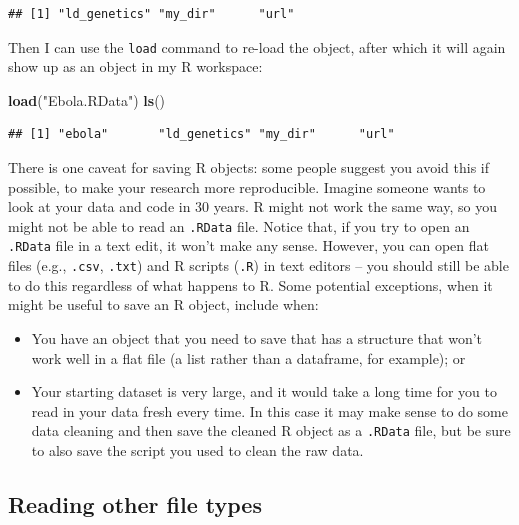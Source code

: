 \documentclass[]{book}
\makeatletter
\newenvironment{Shaded}{\begin{snugshade}}{\end{snugshade}}
\newcommand{\KeywordTok}[1]{\textcolor[rgb]{0.13,0.29,0.53}{\textbf{{#1}}}}
\newcommand{\StringTok}[1]{\textcolor[rgb]{0.31,0.60,0.02}{{#1}}}
\newcommand{\NormalTok}[1]{{#1}}
\providecommand{\tightlist}{%
  \setlength{\itemsep}{0pt}\setlength{\parskip}{0pt}}
\newenvironment{kframe}{%
\medskip{}
\setlength{\fboxsep}{.8em}
 \def\at@end@of@kframe{}%
 \ifinner\ifhmode%
  \def\at@end@of@kframe{\end{minipage}}%
  \begin{minipage}{\columnwidth}%
 \fi\fi%
 \def\FrameCommand##1{\hskip\@totalleftmargin \hskip-\fboxsep
 \colorbox{shadecolor}{##1}\hskip-\fboxsep
     \hskip-\linewidth \hskip-\@totalleftmargin \hskip\columnwidth}%
 \MakeFramed {\advance\hsize-\width
   \@totalleftmargin\z@ \linewidth\hsize
   \@setminipage}}%
 {\par\unskip\endMakeFramed%
 \at@end@of@kframe}
\renewenvironment{Shaded}{\begin{kframe}}{\end{kframe}}
\makeatother
\begin{document}
\begin{verbatim}
## [1] "ld_genetics" "my_dir"      "url"
\end{verbatim}

Then I can use the \texttt{load} command to re-load the object, after
which it will again show up as an object in my R workspace:

\begin{Shaded}
\begin{Highlighting}[]
\KeywordTok{load}\NormalTok{(}\StringTok{"Ebola.RData"}\NormalTok{)}
\KeywordTok{ls}\NormalTok{()}
\end{Highlighting}
\end{Shaded}

\begin{verbatim}
## [1] "ebola"       "ld_genetics" "my_dir"      "url"
\end{verbatim}

There is one caveat for saving R objects: some people suggest you avoid
this if possible, to make your research more reproducible. Imagine
someone wants to look at your data and code in 30 years. R might not
work the same way, so you might not be able to read an \texttt{.RData}
file. Notice that, if you try to open an \texttt{.RData} file in a text
edit, it won't make any sense. However, you can open flat files (e.g.,
\texttt{.csv}, \texttt{.txt}) and R scripts (\texttt{.R}) in text
editors -- you should still be able to do this regardless of what
happens to R. Some potential exceptions, when it might be useful to save
an R object, include when:

\begin{itemize}
\tightlist
\item
  You have an object that you need to save that has a structure that
  won't work well in a flat file (a list rather than a dataframe, for
  example); or
\item
  Your starting dataset is very large, and it would take a long time for
  you to read in your data fresh every time. In this case it may make
  sense to do some data cleaning and then save the cleaned R object as a
  \texttt{.RData} file, but be sure to also save the script you used to
  clean the raw data.
\end{itemize}

\subsection{Reading other file types}\label{reading-other-file-types}
\end{document}
